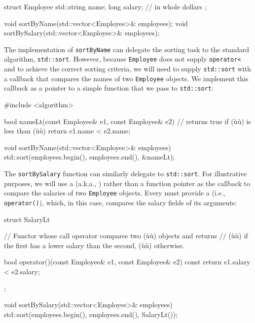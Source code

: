 \begin{emcppslisting}
struct Employee
{
    std::string name;
    long        salary;  // in whole dollars
};

void sortByName(std::vector<Employee>& employees);
void sortBySalary(std::vector<Employee>& employees);
\end{emcppslisting}
    

The implementation of \lstinline!sortByName! can delegate the sorting task
to the standard algorithm, \lstinline!std::sort!. However, because
\lstinline!Employee! does not supply \lstinline!operator<! and to achieve the
correct sorting criteria, we will need to supply \lstinline!std::sort! with
a callback that compares the names of two \lstinline!Employee! objects. We
implement this callback as a pointer to a simple function that we pass
to \lstinline!std::sort!:

\begin{emcppslisting}
#include <algorithm>

bool nameLt(const Employee& e1, const Employee& e2)
    // returns true if (ù{}ù) is less than (ù{}ù)
{
    return e1.name < e2.name;
}

void sortByName(std::vector<Employee>& employees)
{
    std::sort(employees.begin(), employees.end(), &nameLt);
}
\end{emcppslisting}
    

The \lstinline!sortBySalary! function can similarly delegate to
\lstinline!std::sort!. For illustrative purposes, we will use a
 (a.k.a., ) rather than a
function pointer as the callback to compare the salaries of two
\lstinline!Employee! objects. Every  must provide a
 (i.e., \lstinline!operator()!), which, in this case,
compares the salary fields of its arguments:

\begin{emcppslisting}
struct SalaryLt
{
    // Functor whose call operator compares two (ù{}ù) objects and returns
    // (ù{}ù) if the first has a lower salary than the second, (ù{}ù) otherwise.

    bool operator()(const Employee& e1, const Employee& e2) const
    {
        return e1.salary < e2.salary;
    }
};

void sortBySalary(std::vector<Employee>& employees)
{
    std::sort(employees.begin(), employees.end(), SalaryLt());
}
\end{emcppslisting}
    

